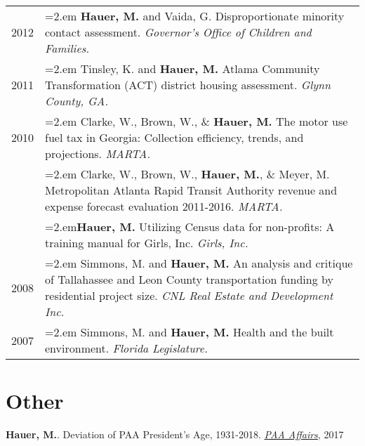 \begin{tabularx}{\linewidth}{lX}
2012    & \hangindent=2.em \textbf{Hauer, M.} and Vaida, G. Disproportionate minority contact assessment. \textit{Governor's Office of Children and                  Families.}\\
2011   & \hangindent=2.em Tinsley, K. and \textbf{Hauer, M.} Atlama Community Transformation (ACT) district housing assessment. \textit{Glynn County,               GA.}\\
2010    & \hangindent=2.em Clarke, W., Brown, W., \& \textbf{Hauer, M.} The motor use fuel tax in Georgia: Collection efficiency, trends, and                        projections. \textit{MARTA.}\\
       & \hangindent=2.em Clarke, W., Brown, W., \textbf{Hauer, M.}, \& Meyer, M. Metropolitan Atlanta Rapid Transit Authority revenue and expense         forecast evaluation 2011-2016. \textit{MARTA.}\\
      & \hangindent=2.em\textbf{Hauer, M.} Utilizing Census data for non-profits: A training manual for Girls, Inc. \textit{Girls, Inc.}\\
2008    & \hangindent=2.em Simmons, M. and \textbf{Hauer, M.} An analysis and critique of Tallahassee and Leon County transportation funding by                      residential project size. \textit{CNL Real Estate and Development Inc.}\\
2007    & \hangindent=2.em Simmons, M. and \textbf{Hauer, M.} Health and the built environment. \textit{Florida Legislature.}\\
\end{tabularx}

\section{Other}

\textbf{Hauer, M.}. Deviation of PAA President's Age, 1931-2018. \href{http://www.populationassociation.org/wp-content/uploads/PAA-Fall-2017.pdf}{\textit{PAA Affairs}}, 2017